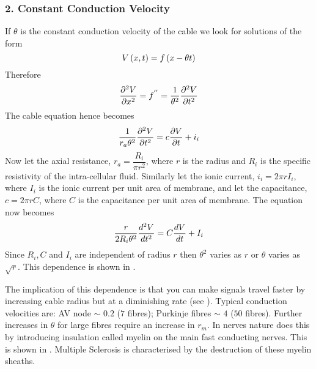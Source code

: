 \subsubsection{2. Constant Conduction Velocity}
If $\theta$ is the constant conduction velocity of the cable we look for
solutions of the form
\begin{equation*}
   V\left( x,t \right) = f\left( x-\theta t \right) 
\end{equation*}
Therefore
\begin{equation*}
   \dfrac{\partial^{2} V}{\partial {x}^{2}} =f^{''}=\dfrac{1}{\theta^{2}} \dfrac{\partial^{2} V}{\partial {t}^{2}} 
\end{equation*}
The cable equation hence becomes
\begin{equation*}
  \dfrac{1}{r_{a}\theta^{2}} \dfrac{\partial^{2} V}{\partial {t}^{2}} =c \dfrac{\partial V}{\partial t} +i_{i}
\end{equation*}
Now let the axial resistance, $r_{a}=\dfrac{R_{i}}{\pi r^{2}}$, where
$r$ is the radius and $R_{i}$ is the specific resistivity of the intra-cellular
fluid. Similarly let the ionic current, $i_{i}=2\pi r I_{i}$, where
$I_{i}$ is the ionic current per unit area of membrane, and let the
capacitance, $c=2\pi r C$, where $C$ is the capacitance per unit area of
membrane. The equation now becomes
\begin{equation}
  \dfrac{r}{2 R_{i} \theta^{2}} \dfrac{ d^{2} V}{d {t}^{2}} =C \dfrac{ d V}{d t} +I_{i}
  \label{eqn:constvelocitycable}
\end{equation}
Since $R_{i}, C$ and $I_{i}$ are independent of radius $r$ then
$\theta^{2}$ varies as $r$ or $\theta$ varies as $\sqrt{r}$. This dependence
is shown in .


The implication of this dependence is that you can make signals travel faster
by increasing cable radius but at a diminishing rate (see
). Typical conduction velocities are: AV
node $\sim$ $0.2$ \mps ($7$ \um fibres); Purkinje fibres $\sim$ $4$ \mps
($50$ \um fibres). Further increases in $\theta$ for large fibres 
require an increase in $r_{m}$. In nerves nature does this by introducing
insulation called myelin on the main fast conducting nerves. This is shown in
.  Multiple Sclerosis is characterised by the
destruction of these myelin sheaths.



